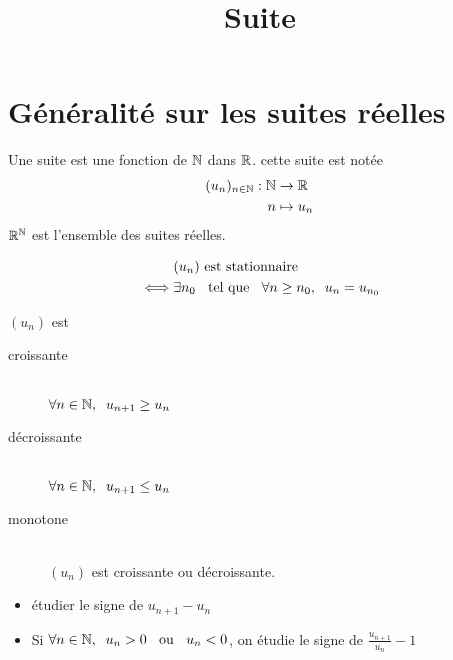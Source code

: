 

\title{Suite}



\maketitle
\pagebreak
\tableofcontents
\pagebreak

\section{Généralité sur les suites réelles}

\begin{dfn}
Une suite est une fonction de $\mathbb{N}$ dans $\mathbb{R}$. cette suite est notée
\begin{align*}
    (u_n)_{n \in \mathbb{N}} : \mathbb{N} &\to \mathbb{R} \\
                        n &\mapsto u_n
\end{align*}
$\mathbb{R}^{\mathbb{N}}$ est l'ensemble des suites réelles.
\end{dfn}

\begin{dfn}
\begin{align*}
        &(u_n) \text{ est stationnaire } \\
\iff    &\exists n_0 \;\;\text{ tel que }\;\; \forall n \geq n_0, \;\; u_n = u_{n_0}
\end{align*}
\end{dfn}

\begin{dfn}
$(u_n)$ est
\begin{description}
    \item[croissante] \quad \\
    \ssi $\forall n \in \mathbb{N}, \;\; u_{n + 1} \geq u_n$
    \item[décroissante] \quad \\
    \ssi $\forall n \in \mathbb{N}, \;\; u_{n + 1} \leq u_n$
    \item[monotone] \quad \\
    \ssi $(u_n)$ est croissante ou décroissante.
\end{description}
\end{dfn}

\begin{rem}
\begin{itemize}
    \item étudier le signe de $u_{n + 1} - u_n$
    \item Si $\forall n \in \mathbb{N}, \;\; u_n > 0 \;\;\text{ ou }\;\; u_n < 0$,
    on étudie le signe de $\frac{u_{n + 1}}{u_n} - 1$
\end{itemize}
\end{rem}

